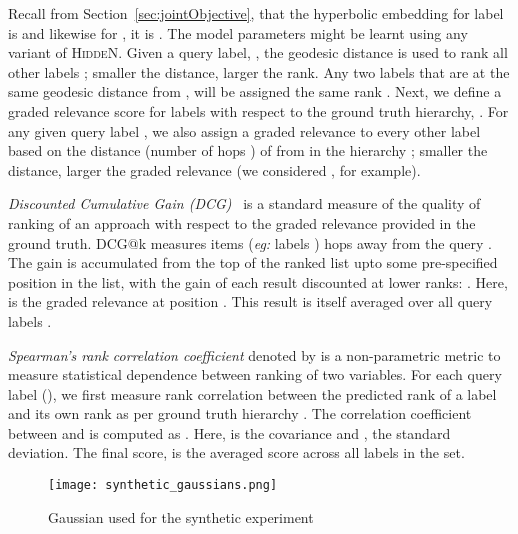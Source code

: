 \documentclass[11pt,a4paper]{article}
\newcommand{\model}{\mbox{\textsc{HiddeN}}}
\begin{document}
Recall from Section~\ref{sec:jointObjective}, that the hyperbolic embedding for label  is  and likewise for , it is . The model parameters  might be learnt using any variant of \model. Given a query label, , the geodesic distance  is used to rank all other labels ; smaller the distance, larger the rank. Any two labels  that are at the same geodesic distance from , will be assigned the same rank . Next, we define a graded relevance score for labels with respect to the ground truth hierarchy, . 
For any given query label , we also assign a graded relevance  to every other label   based on the distance (number of hops ) of  from  in the hierarchy ; smaller the distance, larger the graded relevance (we considered , for example).

\textit{Discounted Cumulative Gain (DCG)}~\citep{dcg} is a standard measure of the quality of ranking of an approach with respect to the graded relevance provided in the ground truth. DCG@k measures items ({\em eg:} labels )  hops away from the query . The gain is accumulated from the top of the ranked list upto some pre-specified position  in the list, with the gain of each result discounted at lower ranks: . Here,  is the graded relevance at position . This result is itself averaged over all query labels . 

\textit{Spearman's rank correlation coefficient} denoted by  is a non-parametric metric to measure statistical dependence between ranking of two variables. For each query label (), we first measure rank correlation between the predicted rank  of a label  and its own rank  as per ground truth hierarchy . The correlation coefficient between  and  is computed as . Here,  is the covariance and , the standard deviation. The final score,  is the averaged score across all labels  in the set.

\begin{figure}
    \centering
    \texttt{[image: synthetic\_gaussians.png]}
    \caption{Gaussian used for the synthetic experiment}
    \label{fig:synthetic}
\end{figure}
\end{document}
